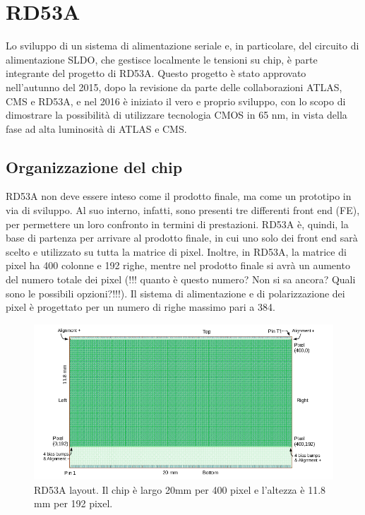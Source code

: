 \chapter{RD53A}

Lo sviluppo di un sistema di alimentazione seriale e, in particolare, del circuito di alimentazione SLDO, che gestisce localmente le tensioni su chip, è parte integrante del progetto di RD53A\cite{RD53A}.
Questo progetto è stato approvato nell'autunno del 2015, dopo la revisione da parte delle collaborazioni ATLAS, CMS e RD53A, e nel 2016 è iniziato il vero e proprio sviluppo, con lo scopo di dimostrare la possibilità di utilizzare tecnologia CMOS  in 65 nm, in vista della fase ad alta luminosità di ATLAS e CMS. 

\section{Organizzazione del chip} 
RD53A non deve essere inteso come il prodotto finale, ma come un prototipo in via di sviluppo.
Al suo interno, infatti, sono presenti tre differenti front end (FE), per permettere un loro confronto in termini di prestazioni.
RD53A è, quindi, la base di partenza per arrivare al prodotto finale, in cui uno solo dei front end sarà scelto e utilizzato su tutta la matrice di pixel.
Inoltre, in RD53A, la matrice di pixel ha 400 colonne e 192 righe, mentre nel prodotto finale si avrà un aumento del numero totale dei pixel (!!! quanto è questo numero? Non si sa ancora? Quali sono le possibili opzioni?!!!). 
Il sistema di alimentazione e di polarizzazione dei pixel è progettato per un numero di righe massimo pari a 384.%
\begin{figure}
\centering
\includegraphics[scale=.4]{Immagini/RD53ALayout}
\caption{RD53A layout. Il chip è largo 20mm per 400 pixel e l'altezza è 11.8 mm per 192 pixel.}
\label{RD53ALayout}
\end{figure}


